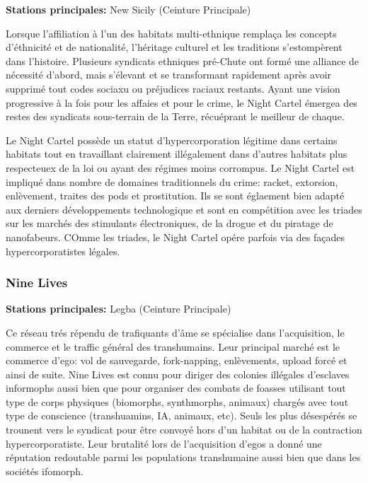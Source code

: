                                              \textbf{Stations principales:} New Sicily (Ceinture Principale) 

                                             Lorsque l'affiliation à l'un des habitats multi-ethnique remplaça les concepts d'éthnicité et de nationalité, l'héritage culturel et les traditions s'estompèrent dans l'histoire. Plusieurs syndicats ethniques pré-Chute ont formé une alliance de nécessité d'abord, mais s'élevant et se transformant rapidement après avoir supprimé tout codes sociaxu ou préjudices raciaux restants. Ayant une vision progressive à la fois pour les affaies et pour le crime, le Night Cartel émergea des restes des syndicats sous-terrain de la Terre, récuéprant le meilleur de chaque. 

                                             Le Night Cartel possède un statut d'hypercorporation légitime dans certains habitats tout en travaillant clairement illégalement dans d'autres habitats plus respecteuex de la loi ou ayant des régimes moins corrompus. Le Night Cartel est impliqué dans nombre de domaines traditionnels du crime: racket, extorsion, enlèvement, traites des pods et prostitution. Ils se sont églaement bien adapté aux derniers développements technologique et sont en compétition avec les triades sur les marchés des stimulants électroniques, de la drogue et du piratage de nanofabeurs. COmme les triades, le Night Cartel opére parfois via des façades hypercorporatistes légales. 

                                             \subsubsection{Nine Lives} \label{sec:nine-lives} 

                                             \textbf{Stations principales:} Legba (Ceinture Principale) 

                                             Ce réseau trés répendu de trafiquants d'âme se spécialise dans l'acquisition, le commerce et le traffic général des transhumains. Leur principal marché est le commerce d'ego: vol de sauvegarde, fork-napping, enlèvements, upload forcé et ainsi de suite. Nine Lives est connu pour diriger des colonies illégales d'esclaves informophs aussi bien que pour organiser des combats de foasses utilisant tout type de corps physiques (biomorphs, synthmorphs, animaux) chargés avec tout type de conscience (transhuamins, IA, animaux, etc). Seuls les plus désespérés se trounent vers le syndicat pour être convoyé hors d'un habitat ou de la contraction hypercorporatiste. Leur brutalité lors de l'acquisition d'egos a donné une réputation redoutable parmi les populations transhumaine aussi bien que dans les sociétés ifomorph. 


